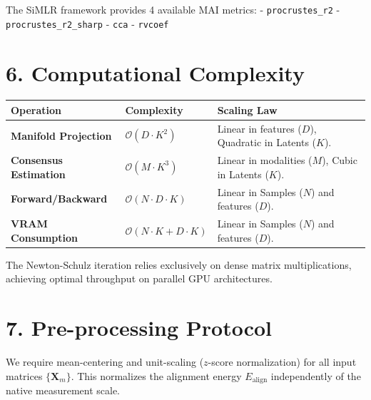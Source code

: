\documentclass[
  letterpaper,
]{report}
\newcounter{none} %
\begin{document}
The SiMLR framework provides 4 available MAI metrics: -
\texttt{procrustes\_r2} - \texttt{procrustes\_r2\_sharp} - \texttt{cca}
- \texttt{rvcoef}

\section{6. Computational Complexity}\label{computational-complexity}

{\def\LTcaptype{none} %
\begin{longtable}[]{@{}
  >{\raggedright\arraybackslash}p{}
  >{\raggedright\arraybackslash}p{}
  >{\raggedright\arraybackslash}p{}@{}}
\toprule\noalign{}
\begin{minipage}[b]{\linewidth}\raggedright
Operation
\end{minipage} & \begin{minipage}[b]{\linewidth}\raggedright
Complexity
\end{minipage} & \begin{minipage}[b]{\linewidth}\raggedright
Scaling Law
\end{minipage} \\
\midrule\noalign{}
\endhead
\bottomrule\noalign{}
\endlastfoot
\textbf{Manifold Projection} & \(\mathcal{O}(D \cdot K^2)\) & Linear in
features (\(D\)), Quadratic in Latents (\(K\)). \\
\textbf{Consensus Estimation} & \(\mathcal{O}(M \cdot K^3)\) & Linear in
modalities (\(M\)), Cubic in Latents (\(K\)). \\
\textbf{Forward/Backward} & \(\mathcal{O}(N \cdot D \cdot K)\) & Linear
in Samples (\(N\)) and features (\(D\)). \\
\textbf{VRAM Consumption} & \(\mathcal{O}(N \cdot K + D \cdot K)\) &
Linear in Samples (\(N\)) and features (\(D\)). \\
\end{longtable}
}

The Newton-Schulz iteration relies exclusively on dense matrix
multiplications, achieving optimal throughput on parallel GPU
architectures.

\section{7. Pre-processing Protocol}\label{pre-processing-protocol}

We require mean-centering and unit-scaling (\(z\)-score normalization)
for all input matrices \(\{\mathbf{X}_m\}\). This normalizes the
alignment energy \(E_{\text{align}}\) independently of the native
measurement scale.
\end{document}
